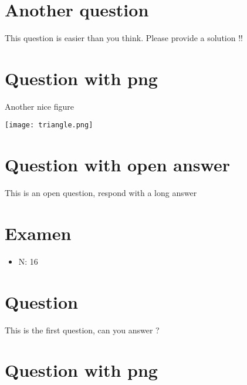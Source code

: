 \documentclass[a4paper,11pt,twoside]{article}
\begin{document}
\section*{Another question}
\label{sec:org5d820f9}

This question is easier than you think. Please provide a solution !!



\section*{Question with png}
\label{sec:org9834a0e}

Another nice figure

\begin{center}
\texttt{[image: triangle.png]}
\end{center}



\section*{Question with open answer}
\label{sec:orgabf7b3f}

This is an open question, respond with a long answer


\subsection*{}
\label{sec:orgff59d01}

\cleardoublepage

\section*{Examen}
\label{sec:org4de638b}
\begin{itemize}
\item N: 16
\end{itemize}
\section*{Question}
\label{sec:orgd075944}

This is the first question, can you answer ?



\section*{Question with png}
\label{sec:orga6858fd}
\end{document}
